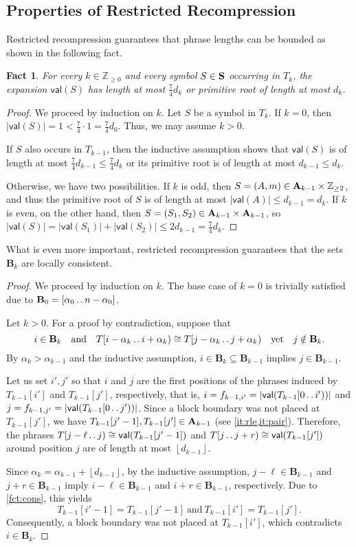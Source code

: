 \documentclass[a4paper]{article}
\newtheorem{fact}[theorem]{Fact}
\theoremstyle{definition}
\theoremstyle{remark}
\newcommand{\Zz}{\mathbb{Z}_{\ge 0}}
\newcommand{\B}{\mathbf{B}}
\newcommand{\floor}[1]{\left\lfloor #1 \right\rfloor}
\newcommand{\sub}{\subseteq}
\newcommand{\dd}{\mathinner{\ldotp\ldotp}}
\newcommand{\val}{\mathsf{val}}
\begin{document}
\subsection{Properties of Restricted Recompression}
Restricted recompression guarantees that phrase lengths can be bounded as shown in the following fact.
\begin{fact}\label{fct:recompr}
For every $k\in \Zz$ and every symbol $S\in \mathbf{S}$ occurring in $T_k$, the expansion $\val(S)$ has length at most $\frac74{d_k}$ or primitive root of length at most $d_k$.
\end{fact}
\begin{proof}
  We proceed by induction on $k$. 
  Let $S$ be a symbol in $T_k$. If $k=0$, then $|\val(S)|=1 < \frac{7}{4}\cdot 1 = \frac74d_0$.
  Thus, we may assume $k>0$.

  If $S$ also occurs in $T_{k-1}$,
  then the inductive assumption shows that $\val(S)$ 
  is of length at most $\frac74{d_{k-1}} \le \frac74{d_k}$
  or its primitive root is of length at most $d_{k-1}\le d_k$. 
  
Otherwise, we have two possibilities.
  If $k$ is odd, then $S = (A,m)\in \mathbf{A}_{k-1}\times \mathbb{Z}_{\ge 2}$,
  and thus the primitive root of $S$ is of length at most $|\val(A)| \le {d_{k-1}}=d_k$.
  If $k$ is even, on the other hand, then $S = (S_1,S_2)\in \mathbf{A}_{k-1}\times \mathbf{A}_{k-1}$,
  so $|\val(S)|=|\val(S_1)|+|\val(S_2)|\le 2{d_{k-1}}=\frac74d_k$.
\end{proof}

What is even more important, restricted recompression guarantees that the sets $\B_k$ are locally consistent.
\lemcons*
\begin{proof}
  We proceed by induction on $k$. The base case of $k=0$ is trivially satisfied
  due to $\B_0 = [\alpha_0\dd n-\alpha_0]$.
  
  Let $k>0$.
  For a proof by contradiction, suppose that \[i\in \B_k\quad \text{and}\quad T[i-\alpha_k \dd i+\alpha_k)\cong 
  T[j-\alpha_k \dd j+\alpha_k)\quad \text{yet}\quad j\notin \B_{k}.\]
  By $\alpha_k>\alpha_{k-1}$ and the inductive assumption, $i\in \B_{k} \sub \B_{k-1}$ implies $j\in \B_{k-1}$.
  
  Let us set $i',j'$ so that
  $i$ and $j$ are the first positions of the phrases induced by $T_{k-1}[i']$ and $T_{k-1}[j']$, respectively,
  that is, $i =f_{k-1,i'}=|\val(T_{k-1}[0 \dd i'))|$ and $j = f_{k-1,j'}= |\val(T_{k-1}[0 \dd j'))|$.
  Since a block boundary was not placed at $T_{k-1}[j']$,
  we have $T_{k-1}[j'-1],T_{k-1}[j']\in \mathbf{A}_{k-1}$ (see \cref{it:rle,it:pair}). 
  Therefore, the phrases $T[j-\ell\dd j)\cong \val(T_{k-1}[j'-1])$ and $T[j\dd j+r)\cong \val(T_{k-1}[j'])$ around position $j$ are of length at most $\floor{d_{k-1}}$. 
  
  Since $\alpha_k = \alpha_{k-1}+\floor{d_{k-1}}$, by the inductive assumption, $j-\ell \in \B_{k-1}$ and $j+r\in \B_{k-1}$ imply $i-\ell\in \B_{k-1}$ and $i+r\in \B_{k-1}$, respectively.
  Due to \cref{fct:cons}, this yields 
  \[
  T_{k-1}[i'-1]=T_{k-1}[j'-1]\ \text{and}\ T_{k-1}[i']=T_{k-1}[j'].\]
  Consequently, a block boundary was not placed at $T_{k-1}[i']$,
  which contradicts $i\in \B_{k}$.
\end{proof}
\end{document}
